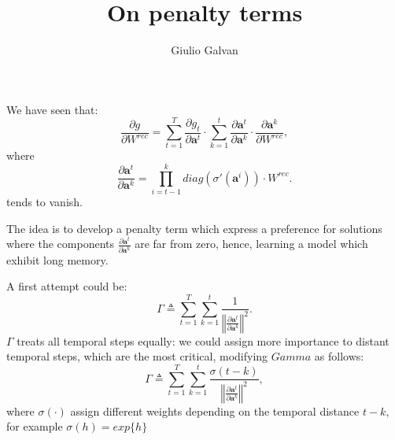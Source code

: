 \documentclass{article}
\title{On penalty terms}
\author{Giulio Galvan}
\renewcommand{\vec}[1]{\boldsymbol{#1}}
\newcommand{\mat}[1]{#1}
\newcommand{\norm}[1]{\left\Vert #1 \right\Vert}
\newcommand{\defeq}{\triangleq}
\begin{document}
	\maketitle

We have seen that:
\begin{equation}
	\frac{\partial g}{\partial \mat{W}^{rec}}= \sum_{t=1}^T\frac{\partial g_t}{\partial \vec{a}^t} \cdot \sum_{k=1}^t \frac{\partial \vec{a}^t}{\partial \vec{a}^k} \cdot \frac{\partial \vec{a}^k}{\partial \mat{W}^{rec}},
\end{equation}
where 
\begin{equation}
	\frac{\partial \vec{a}^t}{\partial \vec{a}^k} = \prod_{i=t-1}^{k}  diag(\sigma'(\vec{a}^i)) \cdot \mat{W}^{rec}.
	\label{eq:temporalComponent}
\end{equation}
tends to vanish.

The idea is to develop a penalty term which express a preference for solutions where the components $\frac{\partial \vec{a}^t}{\partial \vec{a}^k}$ are far from zero, hence, learning a model which exhibit long memory.

A first attempt could be:
\begin{equation}
\Gamma \defeq \sum_{t=1}^T\sum_{k=1}^t \frac{1}{\norm{\frac{\partial \vec{a}^t}{\partial \vec{a}^k}}^2}.
\end{equation}
$\Gamma$ treats all temporal steps equally: we could assign more importance to distant temporal steps, which are the most critical, modifying $Gamma$ as follows:
\begin{equation}
\Gamma \defeq \sum_{t=1}^T\sum_{k=1}^t \frac{\sigma(t-k)}{\norm{\frac{\partial \vec{a}^t}{\partial \vec{a}^k}}^2},
\end{equation}
where $\sigma(\cdot)$ assign different weights depending on the temporal distance $t-k$, for example $\sigma(h)=exp\{h\}$
	
\end{document}
